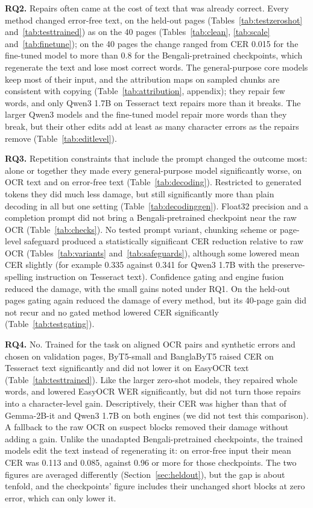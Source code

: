 \documentclass[conference]{IEEEtran}
\begin{document}
\textbf{RQ2.} Repairs often came at the cost of text that was already correct. Every method changed error-free text, on the held-out pages (Tables~\ref{tab:testzeroshot} and~\ref{tab:testtrained}) as on the 40 pages (Tables~\ref{tab:clean}, \ref{tab:scale} and~\ref{tab:finetune}); on the 40 pages the change ranged from CER 0.015 for the fine-tuned model to more than 0.8 for the Bengali-pretrained checkpoints, which regenerate the text and lose most correct words. The general-purpose core models keep most of their input, and the attribution maps on sampled chunks are consistent with copying (Table~\ref{tab:attribution}, appendix); they repair few words, and only Qwen3 1.7B on Tesseract text repairs more than it breaks. The larger Qwen3 models and the fine-tuned model repair more words than they break, but their other edits add at least as many character errors as the repairs remove (Table~\ref{tab:editlevel}).

\textbf{RQ3.} Repetition constraints that include the prompt changed the outcome most: alone or together they made every general-purpose model significantly worse, on OCR text and on error-free text (Table~\ref{tab:decoding}). Restricted to generated tokens they did much less damage, but still significantly more than plain decoding in all but one setting (Table~\ref{tab:decodinggen}). Float32 precision and a completion prompt did not bring a Bengali-pretrained checkpoint near the raw OCR (Table~\ref{tab:checks}). No tested prompt variant, chunking scheme or page-level safeguard produced a statistically significant CER reduction relative to raw OCR (Tables~\ref{tab:variants} and~\ref{tab:safeguards}), although some lowered mean CER slightly (for example 0.335 against 0.341 for Qwen3 1.7B with the preserve-spelling instruction on Tesseract text). Confidence gating and engine fusion reduced the damage, with the small gains noted under RQ1. On the held-out pages gating again reduced the damage of every method, but its 40-page gain did not recur and no gated method lowered CER significantly (Table~\ref{tab:testgating}).

\textbf{RQ4.} No. Trained for the task on aligned OCR pairs and synthetic errors and chosen on validation pages, ByT5-small and BanglaByT5 raised CER on Tesseract text significantly and did not lower it on EasyOCR text (Table~\ref{tab:testtrained}). Like the larger zero-shot models, they repaired whole words, and lowered EasyOCR WER significantly, but did not turn those repairs into a character-level gain. Descriptively, their CER was higher than that of Gemma-2B-it and Qwen3 1.7B on both engines (we did not test this comparison). A fallback to the raw OCR on suspect blocks removed their damage without adding a gain. Unlike the unadapted Bengali-pretrained checkpoints, the trained models edit the text instead of regenerating it: on error-free input their mean CER was 0.113 and 0.085, against 0.96 or more for those checkpoints. The two figures are averaged differently (Section~\ref{sec:heldout}), but the gap is about tenfold, and the checkpoints' figure includes their unchanged short blocks at zero error, which can only lower it.
\end{document}
